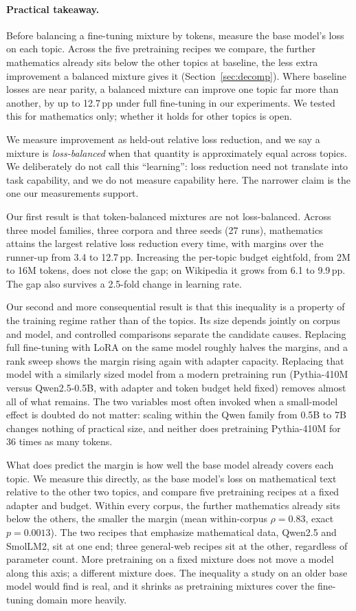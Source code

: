 \documentclass[11pt]{article}
\begin{document}
\paragraph{Practical takeaway.} Before balancing a fine-tuning mixture by
tokens, measure the base model's loss on each topic. Across the five
pretraining recipes we compare, the further mathematics already sits below
the other topics at baseline, the less extra improvement a balanced mixture
gives it (Section~\ref{sec:decomp}). Where baseline losses are near parity,
a balanced mixture can improve one topic far more than another, by up to
12.7\,pp under full fine-tuning in our experiments. We tested this for
mathematics only; whether it holds for other topics is open.

We measure improvement as held-out relative loss reduction, and we say a
mixture is \emph{loss-balanced} when that quantity is approximately equal
across topics. We deliberately do not call this ``learning'': loss reduction need not translate into task capability, and we do not measure capability here. The
narrower claim is the one our measurements support.

Our first result is that token-balanced mixtures are not loss-balanced.
Across three model families, three corpora and three seeds (27 runs),
mathematics attains the largest relative loss reduction every time, with
margins over the runner-up from 3.4 to 12.7\,pp. Increasing the per-topic
budget eightfold, from 2M to 16M tokens, does not close the gap; on
Wikipedia it grows from 6.1 to 9.9\,pp. The gap also survives a 2.5-fold
change in learning rate.

Our second and more consequential result is that this inequality is a
property of the training regime rather than of the topics. Its size depends
jointly on corpus and model, and controlled comparisons separate the
candidate causes. Replacing full fine-tuning with LoRA on the same model
roughly halves the margins, and a rank sweep shows the margin rising again
with adapter capacity. Replacing that model with a similarly sized model
from a modern pretraining run (Pythia-410M versus Qwen2.5-0.5B, with adapter
and token budget held fixed) removes almost all of what remains. The two
variables most often invoked when a small-model effect is doubted do not
matter: scaling within the Qwen family from 0.5B to 7B changes nothing of
practical size, and neither does pretraining Pythia-410M for 36 times as many tokens.

What does predict the margin is how well the base model already covers
each topic. We measure this directly, as the base model's loss on
mathematical text relative to the other two topics, and compare five
pretraining recipes at a fixed adapter and budget. Within every corpus, the
further mathematics already sits below the others, the smaller the margin
(mean within-corpus $\rho{=}0.83$, exact $p{=}0.0013$). The two recipes that
emphasize mathematical data, Qwen2.5 and SmolLM2, sit at one end; three
general-web recipes sit at the other, regardless of parameter count. More
pretraining on a fixed mixture does not move a model along this axis;
a different mixture does. The inequality a study on an older base model
would find is real, and it shrinks as pretraining mixtures cover the
fine-tuning domain more heavily.
\end{document}
